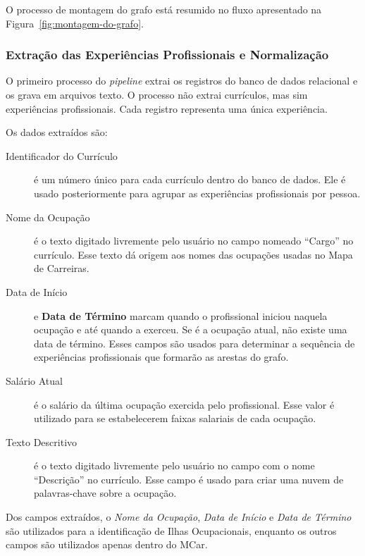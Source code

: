 \documentclass[12pt,a4paper]{article}
\begin{document}
O processo de montagem do grafo está resumido no fluxo apresentado na Figura~\ref{fig:montagem-do-grafo}.


\subsubsection{Extração das Experiências Profissionais e Normalização} \label{sec:extracao-experiencia}

O primeiro processo do \textit{pipeline} extrai os registros do banco de dados relacional e os grava em arquivos texto. O processo não extrai currículos, mas sim experiências profissionais. Cada registro representa uma única experiência.

Os dados extraídos são:

\begin{description}

  \item[Identificador do Currículo] é um número único para cada currículo dentro do banco de dados. Ele é usado posteriormente para agrupar as experiências profissionais por pessoa.

  \item[Nome da Ocupação] é o texto digitado livremente pelo usuário no campo nomeado \enquote{Cargo} no currículo. Esse texto dá origem aos nomes das ocupações usadas no Mapa de Carreiras.

  \item[Data de Início] e \textbf{Data de Término} marcam quando o profissional iniciou naquela ocupação e até quando a exerceu. Se é a ocupação atual, não existe uma data de término. Esses campos são usados para determinar a sequência de experiências profissionais que formarão as arestas do grafo.

  \item[Salário Atual] é o salário da última ocupação exercida pelo profissional. Esse valor é utilizado para se estabelecerem faixas salariais de cada ocupação.

  \item[Texto Descritivo] é o texto digitado livremente pelo usuário no campo com o nome \enquote{Descrição} no currículo. Esse campo é usado para criar uma nuvem de palavras-chave sobre a ocupação.
\end{description}

Dos campos extraídos, o \textit{Nome da Ocupação}, \textit{Data de Início} e \textit{Data de Término} são utilizados para a identificação de Ilhas Ocupacionais, enquanto os outros campos são utilizados apenas dentro do MCar.
\end{document}
